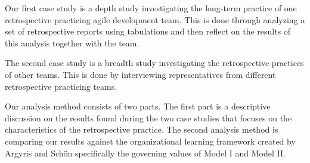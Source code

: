 Our first case study is a depth study investigating the long-term practice of one retrospective practicing agile development team. This is done through analyzing a set of retrospective reports using tabulations and then reflect on the results of this analysis together with the team.

The second case study is a breadth study investigating the retrospective practices of other teams. This is done by interviewing representatives from different retrospective practicing teams.

Our analysis method consists of two parts. The first part is a descriptive discussion on the results found during the two case studies that focuses on the characteristics of the retrospective practice. The second analysis method is comparing our results against the organizational learning framework created by Argyris and Schön \cite{Argyris1996} specifically the governing values of Model I and Model II.

\begin{table}[!h]
	\begin{center}
	\caption{Research design for this multiple-case study.}
	\label{table:research-design}
\end{center}
\end{table}
